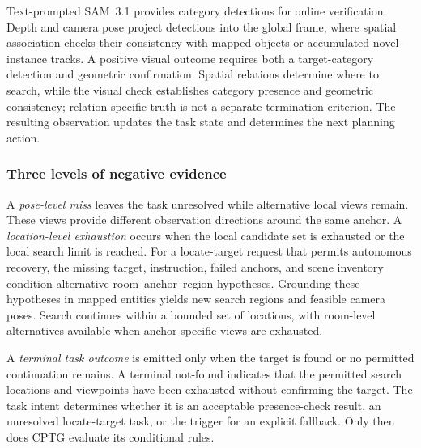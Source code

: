 \documentclass[letterpaper,10pt,journal]{IEEEtran}
\begin{document}
Text-prompted SAM~3.1 provides category detections for online verification. Depth and camera pose project detections into the global frame, where spatial association checks their consistency with mapped objects or accumulated novel-instance tracks. A positive visual outcome requires both a target-category detection and geometric confirmation. Spatial relations determine where to search, while the visual check establishes category presence and geometric consistency; relation-specific truth is not a separate termination criterion. The resulting observation updates the task state and determines the next planning action.

\subsubsection{Three levels of negative evidence}
A \emph{pose-level miss} leaves the task unresolved while alternative local views remain. These views provide different observation directions around the same anchor. A \emph{location-level exhaustion} occurs when the local candidate set is exhausted or the local search limit is reached. For a locate-target request that permits autonomous recovery, the missing target, instruction, failed anchors, and scene inventory condition alternative room--anchor--region hypotheses. Grounding these hypotheses in mapped entities yields new search regions and feasible camera poses. Search continues within a bounded set of locations, with room-level alternatives available when anchor-specific views are exhausted.

A \emph{terminal task outcome} is emitted only when the target is found or no permitted continuation remains. A terminal not-found indicates that the permitted search locations and viewpoints have been exhausted without confirming the target. The task intent determines whether it is an acceptable presence-check result, an unresolved locate-target task, or the trigger for an explicit fallback. Only then does CPTG evaluate its conditional rules.
\end{document}
